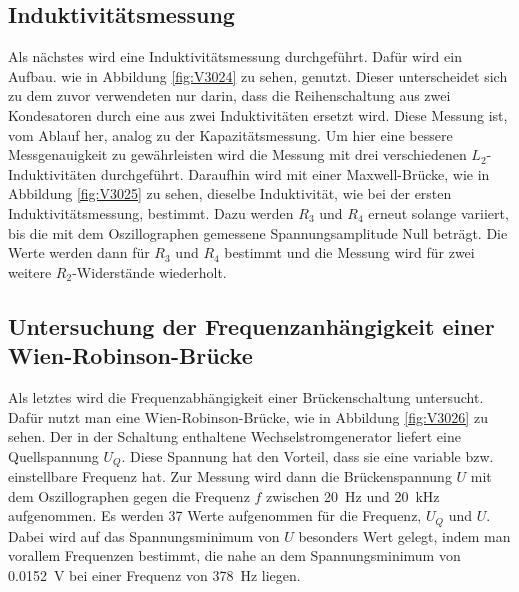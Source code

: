 \documentclass[
  bibliography=totoc,     %
  captions=tableheading,  %
  titlepage=firstiscover, %
]{scrartcl}
\begin{document}
\subsection{Induktivitätsmessung}
Als nächstes wird eine Induktivitätsmessung durchgeführt. Dafür wird ein Aufbau.
wie in Abbildung \ref{fig:V3024} zu sehen, genutzt. Dieser unterscheidet sich
zu dem zuvor verwendeten nur darin, dass die Reihenschaltung aus zwei
Kondesatoren durch eine aus zwei Induktivitäten ersetzt wird. Diese Messung
ist, vom Ablauf her, analog zu der Kapazitätsmessung. Um hier eine bessere
Messgenauigkeit zu gewährleisten wird die Messung mit drei verschiedenen
$L_2$-Induktivitäten durchgeführt.
Daraufhin wird mit einer Maxwell-Brücke, wie in Abbildung \ref{fig:V3025} zu
sehen, dieselbe Induktivität, wie bei der ersten Induktivitätsmessung,
bestimmt. Dazu werden $R_3$ und $R_4$ erneut solange variiert, bis die mit dem
Oszillographen gemessene Spannungsamplitude Null beträgt. Die Werte werden dann
für $R_3$ und $R_4$ bestimmt und die Messung wird für zwei weitere $R_2$-Widerstände
wiederholt.

\subsection{Untersuchung der Frequenzanhängigkeit einer Wien-Robinson-Brücke}
Als letztes wird die Frequenzabhängigkeit einer Brückenschaltung untersucht.
Dafür nutzt man eine Wien-Robinson-Brücke, wie in Abbildung \ref{fig:V3026}
zu sehen. Der in der Schaltung enthaltene Wechselstromgenerator liefert eine
Quellspannung $U_Q$. Diese Spannung hat den Vorteil, dass sie eine variable bzw.
einstellbare Frequenz hat. Zur Messung wird dann die Brückenspannung $U$ mit dem
Oszillographen gegen die Frequenz $f$ zwischen \SI{20}{\hertz} und \SI{20}{\kilo\hertz}
aufgenommen. Es werden 37 Werte aufgenommen für die Frequenz, $U_Q$ und $U$.
Dabei wird auf das Spannungsminimum von $U$ besonders Wert gelegt, indem man
vorallem Frequenzen bestimmt, die nahe an dem Spannungsminimum von
\SI{0.0152}{\volt} bei einer Frequenz von \SI{378}{\hertz} liegen.
\newpage
\end{document}
